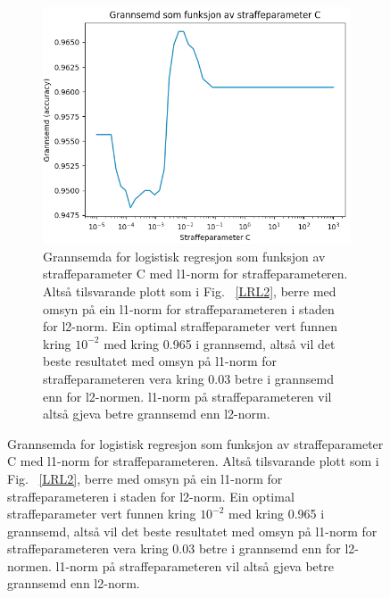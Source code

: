 \documentclass[oneside, nynorsk]{book}
\begin{document}
\begin{figure}[hb!]
  \begin{subfigure}{\textwidth}
        \centering
        \centerline{\includegraphics[width=0.7\linewidth]{LR_L1}}
        \caption{Grannsemda for logistisk regresjon som funksjon av straffeparameter C med l1-norm for straffeparameteren. Altså tilsvarande plott som i Fig. ~\ref{LRL2}, berre med omsyn på ein l1-norm for straffeparameteren i staden for l2-norm.
        Ein optimal straffeparameter vert funnen kring $10^{-2}$ med kring 0.965 i grannsemd, altså vil det beste resultatet med omsyn på l1-norm for straffeparameteren vera kring 0.03 betre i grannsemd enn for l2-normen. l1-norm på straffeparameteren vil altså gjeva betre grannsemd enn l2-norm.}
        \label{LRL1}
    \end{subfigure}
\end{figure}
\end{document}
